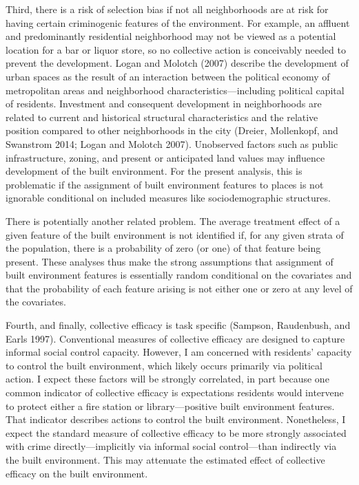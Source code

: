 \documentclass [11pt, proquest] {uwthesis}[2015/03/03]
\begin{document}
Third, there is a risk of selection bias if not all neighborhoods are at risk for having certain criminogenic features of the environment. For example, an affluent and predominantly residential neighborhood may not be viewed as a potential location for a bar or liquor store, so no collective action is conceivably needed to prevent the development. Logan and Molotch (2007) describe the development of urban spaces as the result of an interaction between the political economy of metropolitan areas and neighborhood characteristics---including political capital of residents. Investment and consequent development in neighborhoods are related to current and historical structural characteristics and the relative position compared to other neighborhoods in the city (Dreier, Mollenkopf, and Swanstrom 2014; Logan and Molotch 2007). Unobserved factors such as public infrastructure, zoning, and present or anticipated land values may influence development of the built environment. For the present analysis, this is problematic if the assignment of built environment features to places is not ignorable conditional on included measures like sociodemographic structures.

There is potentially another related problem. The average treatment effect of a given feature of the built environment is not identified if, for any given strata of the population, there is a probability of zero (or one) of that feature being present. These analyses thus make the strong assumptions that assignment of built environment features is essentially random conditional on the covariates and that the probability of each feature arising is not either one or zero at any level of the covariates.

Fourth, and finally, collective efficacy is task specific (Sampson, Raudenbush, and Earls 1997). Conventional measures of collective efficacy are designed to capture informal social control capacity. However, I am concerned with residents' capacity to control the built environment, which likely occurs primarily via political action. I expect these factors will be strongly correlated, in part because one common indicator of collective efficacy is expectations residents would intervene to protect either a fire station or library---positive built environment features. That indicator describes actions to control the built environment. Nonetheless, I expect the standard measure of collective efficacy to be more strongly associated with crime directly---implicitly via informal social control---than indirectly via the built environment. This may attenuate the estimated effect of collective efficacy on the built environment.
\end{document}
